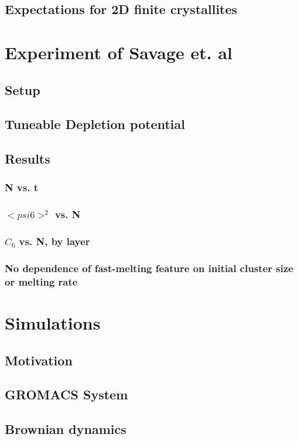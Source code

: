 \documentclass{umthesis}
\begin{document}
\subsection{Expectations for 2D finite crystallites}
\label{sec-1.1.2}
\section{Experiment of Savage et. al}
\label{sec-1.2}
\subsection{Setup}
\label{sec-1.2.1}
\subsection{Tuneable Depletion potential}
\label{sec-1.2.2}
\subsection{Results}
\label{sec-1.2.3}
\subsubsection{N vs. t}
\label{sec-1.2.3.1}
\subsubsection{$< psi6 >^2$ vs. N}
\label{sec-1.2.3.2}
\subsubsection{$C_6$ vs. N, by layer}
\label{sec-1.2.3.3}
\subsubsection{No dependence of fast-melting feature on initial cluster size or melting rate}
\label{sec-1.2.3.4}
\section{Simulations}
\label{sec-1.3}
\subsection{Motivation}
\label{sec-1.3.1}
\subsection{GROMACS System}
\label{sec-1.3.2}
\subsection{Brownian dynamics}
\label{sec-1.3.3}
\end{document}
